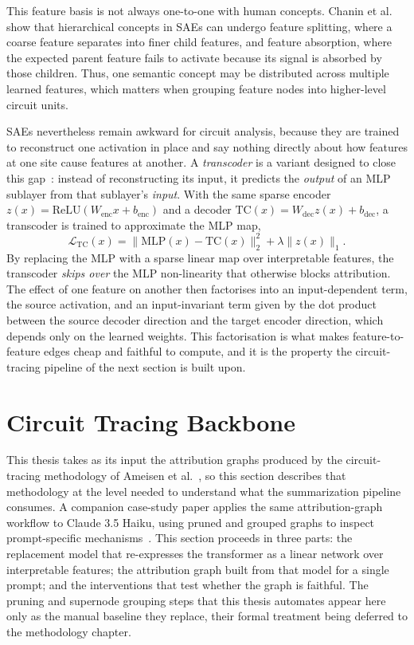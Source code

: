 \documentclass[../main.tex]{subfiles}
\begin{document}
This feature basis is not always one-to-one with human concepts. Chanin et al.~\cite{chanin2024absorption} show that hierarchical concepts in SAEs can undergo feature splitting, where a coarse feature separates into finer child features, and feature absorption, where the expected parent feature fails to activate because its signal is absorbed by those children. Thus, one semantic concept may be distributed across multiple learned features, which matters when grouping feature nodes into higher-level circuit units.

SAEs nevertheless remain awkward for circuit analysis, because they are trained to reconstruct one activation in place and say nothing directly about how features at one site cause features at another. A \emph{transcoder} is a variant designed to close this gap~\cite{dunefsky2024transcoders}: instead of reconstructing its input, it predicts the \emph{output} of an MLP sublayer from that sublayer's \emph{input}. With the same sparse encoder $z(x) = \mathrm{ReLU}(W_{\mathrm{enc}} x + b_{\mathrm{enc}})$ and a decoder $\mathrm{TC}(x) = W_{\mathrm{dec}} z(x) + b_{\mathrm{dec}}$, a transcoder is trained to approximate the MLP map,
\begin{equation}
\mathcal{L}_{\mathrm{TC}}(x) = \lVert \mathrm{MLP}(x) - \mathrm{TC}(x) \rVert_2^2 + \lambda \lVert z(x) \rVert_1 .
\end{equation}
By replacing the MLP with a sparse linear map over interpretable features, the transcoder \emph{skips over} the MLP non-linearity that otherwise blocks attribution. The effect of one feature on another then factorises into an input-dependent term, the source activation, and an input-invariant term given by the dot product between the source decoder direction and the target encoder direction, which depends only on the learned weights. This factorisation is what makes feature-to-feature edges cheap and faithful to compute, and it is the property the circuit-tracing pipeline of the next section is built upon.
\section{Circuit Tracing Backbone}
\label{sec:circuit-tracing}
This thesis takes as its input the attribution graphs produced by the circuit-tracing methodology of Ameisen et al.~\cite{ameisen2025circuit}, so this section describes that methodology at the level needed to understand what the summarization pipeline consumes. A companion case-study paper applies the same attribution-graph workflow to Claude 3.5 Haiku, using pruned and grouped graphs to inspect prompt-specific mechanisms~\cite{lindsey2025biology}. This section proceeds in three parts: the replacement model that re-expresses the transformer as a linear network over interpretable features; the attribution graph built from that model for a single prompt; and the interventions that test whether the graph is faithful. The pruning and supernode grouping steps that this thesis automates appear here only as the manual baseline they replace, their formal treatment being deferred to the methodology chapter.
\end{document}
